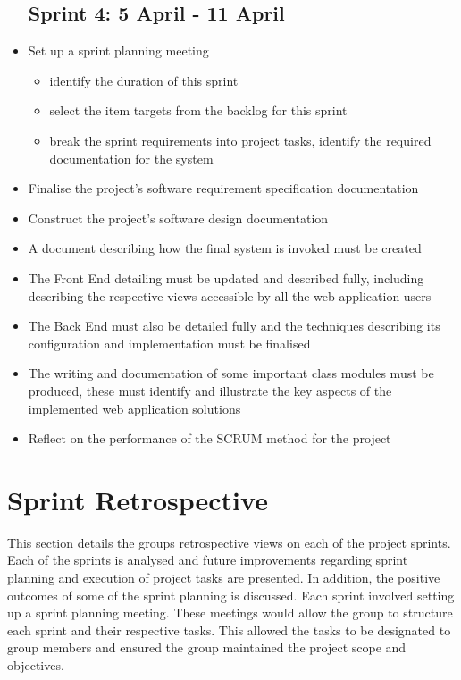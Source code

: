 \documentclass[10pt, a4paper, onecolumn]{scrartcl}
\begin{document}
\begin{itemize}[noitemsep]
		\subsection{Sprint 4: 5 April - 11 April}
				\item Set up a sprint planning meeting
				\begin{itemize}
					\item identify the duration of this sprint
					\item select the item targets from the backlog for this sprint
					\item break the sprint requirements into project tasks, identify the required documentation for the system
				\end{itemize}
				\item Finalise the project's software requirement specification documentation
				\item Construct the project's software design documentation
				\item A document describing how the final system is invoked must be created
				\item The Front End detailing must be updated and described fully, including describing the respective views accessible by all the web application users
				\item The Back End must also be detailed fully and the techniques describing its configuration and implementation must be finalised
				\item The writing and documentation of some important class modules must be produced, these must identify and illustrate the key aspects of the implemented web application solutions
				\item Reflect on the performance of the SCRUM method for the project
			\end{itemize}	
			
		
	\section{Sprint Retrospective}
	
		This section details the groups retrospective views on each of the project sprints. Each of the sprints is analysed and future improvements regarding sprint planning and execution of project tasks are presented. In addition, the positive outcomes of some of the sprint planning is discussed. Each sprint involved setting up a sprint planning meeting. These meetings would allow the group to structure each sprint and their respective tasks. This allowed the tasks to be designated to group members and ensured the group maintained the project scope and objectives.
		
\end{document}
